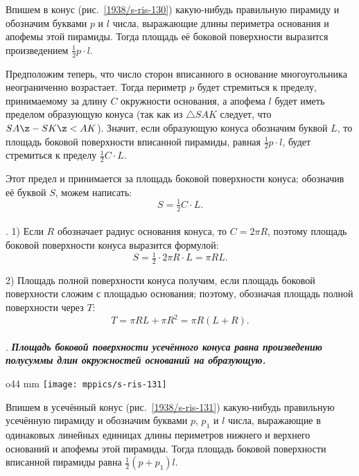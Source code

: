 Впишем в конус (рис.~\ref{1938/s-ris-130}) какую-нибудь правильную пирамиду и обозначим буквами $p$ и $l$ числа, выражающие длины периметра основания и апофемы этой пирамиды.
Тогда площадь её боковой поверхности выразится произведением $\tfrac12 p\cdot l$.

Предположим теперь, что число сторон вписанного в основание многоугольника неограниченно возрастает.
Тогда периметр $p$ будет стремиться к пределу, принимаемому за длину $C$ окружности основания, а апофема $l$ будет иметь пределом образующую конуса (так как из $\triangle SAK$ следует, что $SA\z-SK\z<AK$).
Значит, если образующую конуса обозначим буквой $L$, то площадь боковой поверхности вписанной пирамиды, равная $\tfrac12 p\cdot l$, будет стремиться к пределу $\tfrac12 C\cdot L$. 

Этот предел и принимается за площадь боковой поверхности конуса; обозначив её буквой $S$, можем написать:
\[S = \tfrac12 C\cdot L.\]

\paragraph{}\label{1938/s115}
. 1) Если $R$ обозначает радиус основания конуса, то $C= 2\pi R$, поэтому площадь боковой поверхности конуса выразится формулой:
\[S
= \tfrac12 \cdot 2\pi R \cdot L
=\pi RL.\]

2) Площадь полной поверхности конуса получим, если площадь боковой поверхности сложим с площадью основания;
поэтому, обозначая площадь полной поверхности через $T$:
\[T= \pi RL + \pi R^2 = \pi R(L + R).\]

\paragraph{}\label{1938/s116}
.
\textbf{\emph{Площадь боковой поверхности усечённого конуса равна произведению полусуммы длин окружностей оснований на образующую.}}

\begin{wrapfigure}{o}{44 mm}
\vskip-0mm
\centering
\texttt{[image: mppics/s-ris-131]}
\caption{}\label{1938/s-ris-131}
\vskip-0mm
\end{wrapfigure}

Впишем в усечённый конус (рис.~\ref{1938/s-ris-131}) какую-нибудь правильную усечённую пирамиду и обозначим буквами $p$, $p_1$ и $l$ числа, выражающие в одинаковых линейных единицах длины периметров нижнего и верхнего оснований и апофемы этой пирамиды.
Тогда площадь боковой поверхности вписанной пирамиды равна $\tfrac12 (p+p_1)l$.

